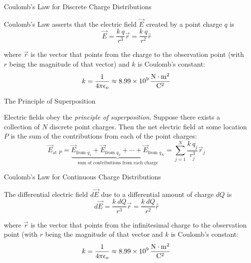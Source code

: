 \documentclass{beamer}
\begin{document}
\begin{frame}{Coulomb's Law for Discrete Charge Distributions}

Coulomb's Law asserts that the electric field $\vec{E}$ created by a point charge $q$ is
\begin{equation*}
    \vec{E} = \frac{k\ q}{r^3} \vec{r} = \frac{k\ q}{r^2} \hat{r}
\end{equation*}

where $\vec{r}$ is the vector that points from the charge to the observation point (with $r$ being the magnitude of that vector) and $k$ is Coulomb's constant:
\begin{equation*}
    k = \frac{1}{4\pi\epsilon_o} \approx \SI{8.99e9}{\frac{\newton\cdot\metre^2}{\coulomb^2}}
\end{equation*}

\end{frame}

\begin{frame}{The Principle of Superposition}

Electric fields obey the \emph{principle of superposition}. Suppose there exists a collection of $N$ discrete point charges. Then the net electric field at some location $P$ is the sum of the contributions from each of the point charges:
\begin{equation*}
    \vec{E}_{\text{at }P} = \underbrace{\vec{E}_{\text{from } q_1} + \vec{E}_{\text{from } q_2} + \cdots + \vec{E}_{\text{from } q_N}}_{\text{sum of contributions from each charge}} = \sum\limits_{j = 1}^{N} \frac{k\ q_j}{r_j^3} \vec{r}_j
\end{equation*}

\end{frame}

\begin{frame}{Coulomb's Law for Continuous Charge Distributions}

The differential electric field $d\vec{E}$ due to a differential amount of charge $dQ$ is
\begin{equation*}
    d\vec{E} = \frac{k\ dQ}{r^3} \vec{r} = \frac{k\ dQ}{r^2} \hat{r}
\end{equation*}

where $\vec{r}$ is the vector that points from the infinitesimal charge to the observation point (with $r$ being the magnitude of that vector and $k$ is Coulomb's constant:
\begin{equation*}
    k = \frac{1}{4\pi\epsilon_o} \approx \SI{8.99e9}{\frac{\newton\cdot\metre^2}{\coulomb^2}}
\end{equation*}

\end{frame}
\end{document}
